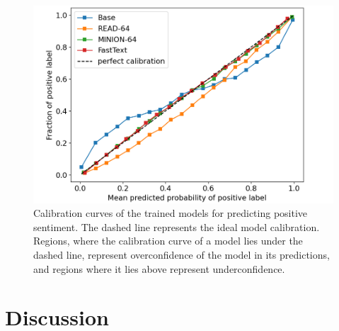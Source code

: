 \documentclass[10pt,conference,compsocconf]{IEEEtran}
\begin{document}
\begin{figure}
    \centering
    \includegraphics[width=\columnwidth]{calibration_plot_cropped.png}
    \caption{Calibration curves of the trained models for predicting positive sentiment. The dashed line represents the ideal model calibration. Regions, where the calibration curve of a model lies under the dashed line, represent overconfidence of the model in its predictions, and regions where it lies above represent underconfidence.}
    \label{fig:calibration-plots}
\end{figure}

\section{Discussion}
\label{sec:discussion}
\end{document}
